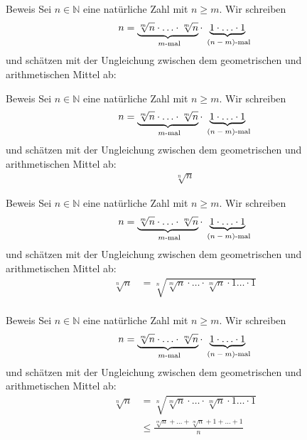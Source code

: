 \documentclass[10pt]{beamer}
\def\bN{\mathbb{N}}
\begin{document}
\begin{frame}{Beweis}
    Sei \( n \in \bN \) eine natürliche Zahl mit \( n \geq m \). Wir schreiben 
    \[
        n = \underbrace{\sqrt[m]{n} \cdot \ldots \cdot \sqrt[m]{n}}_{\text{ \( m \)-mal}} \cdot \underbrace{1 \cdot \ldots \cdot 1}_{\text{ \( \left( n - m \right) \)-mal}} 
    \]
    und schätzen mit der Ungleichung zwischen dem geometrischen und arithmetischen Mittel ab:
\end{frame}


\begin{frame}{Beweis}
    Sei \( n \in \bN \) eine natürliche Zahl mit \( n \geq m \). Wir schreiben 
    \[
        n = \underbrace{\sqrt[m]{n} \cdot \ldots \cdot \sqrt[m]{n}}_{\text{ \( m \)-mal}} \cdot \underbrace{1 \cdot \ldots \cdot 1}_{\text{ \( \left( n - m \right) \)-mal}} 
    \]
    und schätzen mit der Ungleichung zwischen dem geometrischen und arithmetischen Mittel ab:
    \begin{align*}
        \sqrt[n]{n}
    \end{align*}
\end{frame}



\begin{frame}{Beweis}
    Sei \( n \in \bN \) eine natürliche Zahl mit \( n \geq m \). Wir schreiben 
    \[
        n = \underbrace{\sqrt[m]{n} \cdot \ldots \cdot \sqrt[m]{n}}_{\text{ \( m \)-mal}} \cdot \underbrace{1 \cdot \ldots \cdot 1}_{\text{ \( \left( n - m \right) \)-mal}} 
    \]
    und schätzen mit der Ungleichung zwischen dem geometrischen und arithmetischen Mittel ab:
    \begin{align*}
        \sqrt[n]{n}
        & =\sqrt[n]{\sqrt[m]{n} \cdot \ldots \cdot \sqrt[m]{n} \cdot 1 \ldots \cdot 1} \\
    \end{align*}
\end{frame}



\begin{frame}{Beweis}
    Sei \( n \in \bN \) eine natürliche Zahl mit \( n \geq m \). Wir schreiben 
    \[
        n = \underbrace{\sqrt[m]{n} \cdot \ldots \cdot \sqrt[m]{n}}_{\text{ \( m \)-mal}} \cdot \underbrace{1 \cdot \ldots \cdot 1}_{\text{ \( \left( n - m \right) \)-mal}} 
    \]
    und schätzen mit der Ungleichung zwischen dem geometrischen und arithmetischen Mittel ab:
    \begin{align*}
        \sqrt[n]{n}
        & =\sqrt[n]{\sqrt[m]{n} \cdot \ldots \cdot \sqrt[m]{n} \cdot 1 \ldots \cdot 1} \\
        & \leq \frac{\sqrt[m]{n} + \ldots + \sqrt[m]{n} + 1 + \ldots + 1}{n} \\
    \end{align*}
\end{frame}
\end{document}
